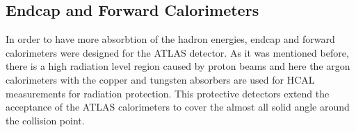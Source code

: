 \documentclass[a4paper,9pt]{article}
\begin{document}
\subsection{Endcap and Forward Calorimeters}
In order to have more absorbtion of the hadron energies, endcap and
forward calorimeters were designed for the ATLAS detector. As it was
mentioned before, there is a high radiation level region caused by proton
beams and here the argon calorimeters with the copper and tungsten absorbers
are used for HCAL measurements for radiation protection. This protective detectors extend the
acceptance of the ATLAS calorimeters to cover the almost all solid
angle around the collision point.
\end{document}
